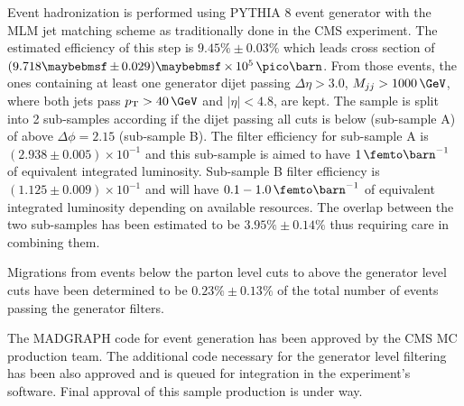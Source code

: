 Event hadronization is performed using \textsc{PYTHIA 8} event generator with the MLM jet matching scheme as traditionally done in the \gls{CMS} experiment. The estimated efficiency of this step is $9.45\% \pm 0.03\%$ which leads cross section of $(9.718 \pm 0.029) \times 10^5\,\pico\barn$. From those events, the ones containing at least one generator dijet passing $\Delta\eta > 3.0$, $M_{jj} > 1000\,\GeV$, where both jets pass $\pt > 40\,\GeV$ and $|\eta|<4.8$, are kept. The sample is split into 2 sub-samples according if the dijet passing all cuts is below (sub-sample A) of above $\Delta\phi=2.15$ (sub-sample B). The filter efficiency for sub-sample A is $(2.938 \pm 0.005) \times 10^{-1}$ and this sub-sample is aimed to have $1\,\femto\barn^{-1}$ of equivalent integrated luminosity. Sub-sample B filter efficiency is $(1.125 \pm 0.009) \times 10^{-1}$ and will have $0.1-1.0\,\femto\barn^{-1}$ of equivalent integrated luminosity depending on available resources. The overlap between the two sub-samples has been estimated to be $3.95\% \pm 0.14\%$ thus requiring care in combining them.

Migrations from events below the parton level cuts to above the generator level cuts have been determined to be $0.23\% \pm 0.13\%$ of the total number of events passing the generator filters.

The \textsc{MADGRAPH} code for event generation has been approved by the \gls{CMS} \gls{MC} production team. The additional code necessary for the generator level filtering has been also approved and is queued for integration in the experiment's software. Final approval of this sample production is under way. 

